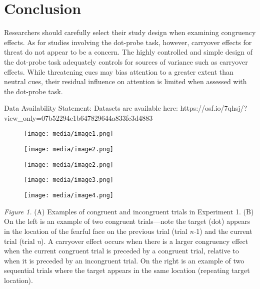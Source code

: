 \documentclass{article}
\begin{document}
{	\section{Conclusion}



	Researchers should carefully select their study design when examining congruency effects. As for studies involving the dot-probe task, however, carryover effects for threat do not appear to be a concern. The highly controlled and simple design of the dot-probe task adequately controls for sources of variance such as carryover effects. While threatening cues may bias attention to a greater extent than neutral cues, their residual influence on attention is limited when assessed with the dot-probe task.



	Data Availability Statement:\emph{ }Datasets are available here: https://osf.io/7qhsj/?view_only=07b52294c1b647829644a833fc3d4883







	\begin{figure}
		\caption{}

		\label{fig:rId11}

		\texttt{[image: media/image1.png]}
	\end{figure}
	\begin{figure}
		\caption{}

		\label{fig:rId12}

		\texttt{[image: media/image2.png]}
	\end{figure}
	\begin{figure}
		\caption{}

		\label{fig:rId12}

		\texttt{[image: media/image2.png]}
	\end{figure}
	\begin{figure}
		\caption{}

		\label{fig:rId13}

		\texttt{[image: media/image3.png]}
	\end{figure}
	\begin{figure}
		\caption{}

		\label{fig:rId14}

		\texttt{[image: media/image4.png]}
	\end{figure}



	\emph{Figure 1. }(A) Examples of congruent and incongruent trials in Experiment 1. (B) On the left is an example of two congruent trials—note the target (dot) appears in the location of the fearful face on the previous trial (trial \emph{n-}1) and the current trial (trial \emph{n}). A carryover effect occurs when there is a larger congruency effect when the current congruent trial is preceded by a congruent trial, relative to when it is preceded by an incongruent trial. On the right is an example of two sequential trials where the target appears in the same location (repeating target location).



}
\end{document}
